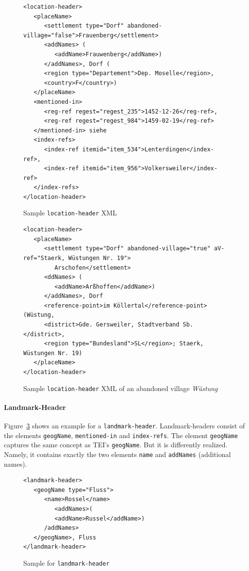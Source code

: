 \begin{figure}[H]
\centering
\begin{verbatim}
<location-header>
   <placeName>
      <settlement type="Dorf" abandoned-village="false">Frauenberg</settlement>
      <addNames> (
         <addName>Frauwenberg</addName>)
      </addNames>, Dorf (
      <region type="Departement">Dep. Moselle</region>, 
      <country>F</country>) 
   </placeName>
   <mentioned-in>
      <reg-ref regest="regest_235">1452-12-26</reg-ref>, 
      <reg-ref regest="regest_984">1459-02-19</reg-ref>
   </mentioned-in> siehe 
   <index-refs>
      <index-ref itemid="item_534">Lenterdingen</index-ref>,
      <index-ref itemid="item_956">Volkersweiler</index-ref>
   </index-refs>
</location-header>
\end{verbatim}
\caption{Sample \texttt{location-header} XML}
\label{fig:location-header-xml}
\end{figure}

\begin{figure}[H]
\centering
\begin{verbatim}
<location-header>
   <placeName>
      <settlement type="Dorf" abandoned-village="true" aV-ref="Staerk, Wüstungen Nr. 19">
         Arschofen</settlement>
      <ddNames> (
         <addName>Arßhoffen</addName>)
      </addNames>, Dorf 
      <reference-point>im Köllertal</reference-point> (Wüstung, 
      <district>Gde. Gersweiler, Stadtverband Sb.</district>, 
      <region type="Bundesland">SL</region>; Staerk, Wüstungen Nr. 19) 
   </placeName>
</location-header>
\end{verbatim}
\caption{Sample \texttt{location-header} XML of an abandoned village \textit{Wüstung}}
\label{fig:location-wuest-xml}
\end{figure}


\paragraph{Landmark-Header}
Figure~\ref{fig:landmark-header-xml} shows an example for a \texttt{landmark-header}. Landmark-headers consist of the elements \texttt{geogName}, \texttt{mentioned-in} and \texttt{index-refs}. The element \texttt{geogName} captures the same concept as TEI's \texttt{geogName}. But it is differently realized. Namely, it contains exactly the two elements \texttt{name} and \texttt{addNames} (additional names).

\begin{figure}[H]
\centering
\begin{verbatim}
<landmark-header>
   <geogName type="Fluss">
      <name>Rossel</name>
         <addNames>(
         <addName>Russel</addName>)
      /addNames>
   </geogName>, Fluss 
</landmark-header>
\end{verbatim}
\caption{Sample for \texttt{landmark-header}}
\label{fig:landmark-header-xml}
\end{figure}


